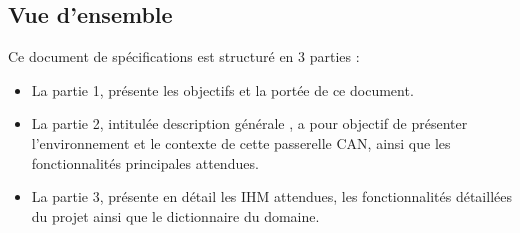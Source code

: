 \newpage
\subsection{Vue d'ensemble} %
Ce document de spécifications est structuré en 3 parties :
\begin{itemize} 
    \item La partie 1, présente les objectifs et la portée de ce document.
    \item La partie 2, intitulée {\guillemotleft} description générale {\guillemotright}, a pour objectif de présenter l'environnement et le contexte de cette passerelle CAN, ainsi que les fonctionnalités principales attendues.
    \item La partie 3, présente en détail les IHM attendues, les fonctionnalités détaillées du projet ainsi que le dictionnaire du domaine.
\end{itemize}
\newpage